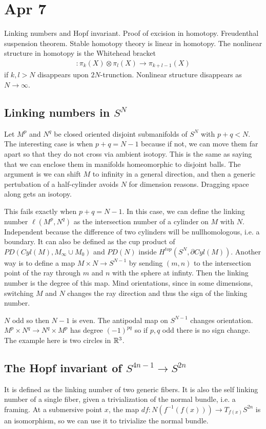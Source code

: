 \documentclass[12pt]{article}
\begin{document}
\section{Apr 7}
Linking numbers and Hopf invariant. Proof of excision in homotopy. Freudenthal suspension theorem. Stable homotopy theory is linear in homotopy. The nonlinear structure in homotopy is the Whitehead bracket \begin{align*}
    [,]: \pi_k(X) \otimes \pi_l(X) \to \pi_{k+l-1}(X)
\end{align*} if $k,l > N$ disappears upon $2N$-trunction. Nonlinear structure disappears as $N\to\infty$.

\subsection{Linking numbers in $S^N$}
Let $M^p$ and $N^q$ be closed oriented disjoint submanifolds of $S^N$ with $p+q < N$. The interesting case is when $p+q = N-1$ because if not, we can move them far apart so that they do not cross via ambient isotopy. This is the same as saying that we can enclose them in manifolds homeomorphic to disjoint balls. The argument is we can shift $M$ to infinity in a general direction, and then a generic pertubation of a half-cylinder avoids $N$ for dimension reasons. Dragging space along gets an isotopy.

This fails exactly when $p+q = N-1$. In this case, we can define the linking number $\ell(M^p, N^q)$ as the intersection number of a cylinder on $M$ with $N$. Independent because the difference of two cylinders will be nullhomologous, i.e. a boundary. It can also be defined as the cup product of $PD(Cyl(M),M_\infty \cup M_0)$ and $PD(N)$ inside $H^{top}(S^N, \partial Cyl(M))$. Another way is to define a map $M\times N \to S^{N-1}$ by sending $(m,n)$ to the intersection point of the ray through $m$ and $n$ with the sphere at infinty. Then the linking number is the degree of this map. Mind orientations, since in some dimensions, switching $M$ and $N$ changes the ray direction and thus the sign of the linking number.

\begin{example}
    $N$ odd so then $N-1$ is even. The antipodal map on $S^{N-1}$ changes orientation. $M^p \times N^q \to N^q \times M^p$ has degree $(-1)^{pq}$ so if $p,q$ odd there is no sign change. The example here is two circles in $\mathbb{R}^3$.
\end{example}


\subsection{The Hopf invariant of $S^{4n-1} \to S^{2n}$}
It is defined as the linking number of two generic fibers. It is also the self linking number of a single fiber, given a trivialization of the normal bundle, i.e. a framing. At a submersive point $x$, the map $df: N(f^{-1}(f(x))) \to T_{f(x)} S^{2n}$ is an isomorphism, so we can use it to trivialize the normal bundle. 
\end{document}
